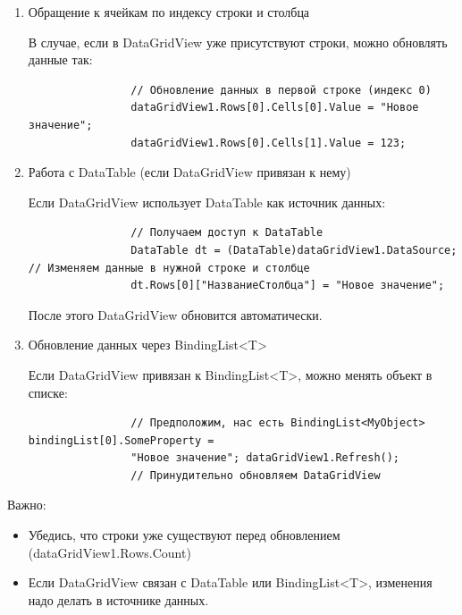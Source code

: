 \documentclass[12pt]{article}
\renewcommand{\texttt}[1]{{\small\ttfamily #1}}
\numberwithin{listing}{section}
\numberwithin{figure}{section}
\begin{document}
\begin{enumerate}
	\item Обращение к ячейкам по индексу строки и столбца

	      В случае, если в DataGridView уже присутствуют строки, можно обновлять данные так:

	      \begin{verbatim}
                // Обновление данных в первой строке (индекс 0)
                dataGridView1.Rows[0].Cells[0].Value = "Новое значение";
                dataGridView1.Rows[0].Cells[1].Value = 123;
          \end{verbatim}

	\item Работа с \texttt{DataTable} (если \texttt{DataGridView} привязан к нему)

	      Если \texttt{DataGridView} использует \texttt{DataTable} как источник данных:

	      \begin{verbatim}
                // Получаем доступ к DataTable
                DataTable dt = (DataTable)dataGridView1.DataSource; // Изменяем данные в нужной строке и столбце
                dt.Rows[0]["НазваниеСтолбца"] = "Новое значение";
          \end{verbatim}

	      После этого \texttt{DataGridView} обновится автоматически.

	\item Обновление данных через \texttt{BindingList<T>}

	      Если \texttt{DataGridView} привязан к \texttt{BindingList<T>}, можно менять объект в списке:

	      \begin{verbatim}
                // Предположим, нас есть BindingList<MyObject> bindingList[0].SomeProperty =
                "Новое значение"; dataGridView1.Refresh();
                // Принудительно обновляем DataGridView
          \end{verbatim}
\end{enumerate}

\noindent \textcolor{CtpRed}{Важно:}
\begin{itemize}
	\item Убедись, что строки уже существуют перед обновлением (\texttt{dataGridView1.Rows.Count})
	\item Если \texttt{DataGridView} связан с \texttt{DataTable} или \texttt{BindingList<T>}, изменения надо делать в источнике данных.
\end{itemize}
\end{document}

